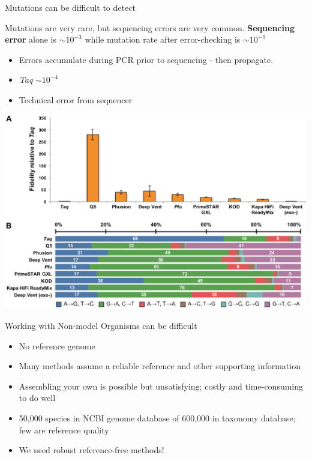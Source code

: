 \documentclass[table]{beamer}
\begin{document}
\begin{frame}{Mutations can be difficult to detect}

\begin{block}{Mutations are very rare, but sequencing errors are very common.}
\textbf{Sequencing error} alone is \textbf{$\sim10^{-3}$} while mutation rate after error-checking is \textbf{$\sim10^{-9}$}
\end{block}

\begin{itemize}
\item Errors accumulate during PCR prior to sequencing - then propagate.
\item \textit{Taq} $\sim10^{-4}$
\item Technical error from sequencer
\end{itemize}

\includegraphics[trim={1cm 4cm 0 0},clip,width=\linewidth]{pcr_errors.png}

\end{frame}

\begin{frame}{Working with Non-model Organisms can be difficult}

\begin{itemize}
	\item No reference genome
	\item Many methods assume a reliable reference and other supporting information
	\item Assembling your own is possible but unsatisfying; costly and time-consuming to do well
	\item 50,000 species in NCBI genome database of 600,000 in taxonomy database; few are reference quality
	\item We need robust reference-free methods!
\end{itemize}

\end{frame}
\end{document}
